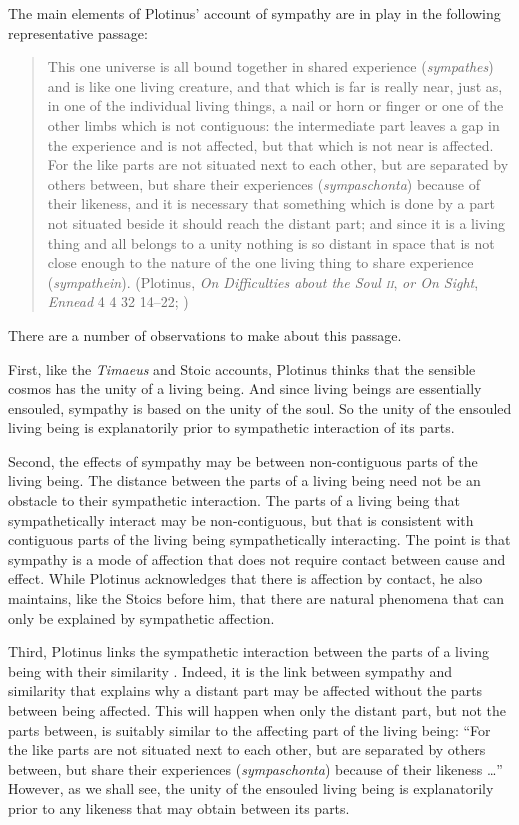 The main elements of Plotinus' account of sympathy are in play in the following representative passage:
\begin{quote}
	This one universe is all bound together in shared experience (\emph{sympathes}) and is like one living creature, and that which is far is really near, just as, in one of the individual living things, a nail or horn or finger or one of the other limbs which is not contiguous: the intermediate part leaves a gap in the experience and is not affected, but that which is not near is affected. For the like parts are not situated next to each other, but are separated by others between, but share their experiences (\emph{sympaschonta}) because of their likeness, and it is necessary that something which is done by a part not situated beside it should reach the distant part; and since it is a living thing and all belongs to a unity nothing is so distant in space that is not close enough to the nature of the one living thing to share experience (\emph{sympathein}). (Plotinus, \emph{On Difficulties about the Soul \textsc{ii}}, \emph{or On Sight}, \emph{Ennead} 4 4 32 14--22; \citealt[235--7]{Armstrong:1984aa})
\end{quote}
There are a number of observations to make about this passage.

First, like the \emph{Timaeus} and Stoic accounts, Plotinus thinks that the sensible cosmos has the unity of a living being. And since living beings are essentially ensouled, sympathy is based on the unity of the soul. So the unity of the ensouled living being is explanatorily prior to sympathetic interaction of its parts.

Second, the effects of sympathy may be between non-contiguous parts of the living being. The distance between the parts of a living being need not be an obstacle to their sympathetic interaction. The parts of a living being that sympathetically interact may be non-contiguous, but that is consistent with contiguous parts of the living being sympathetically interacting. The point is that sympathy is a mode of affection that does not require contact between cause and effect. While Plotinus acknowledges that there is affection by contact, he also maintains, like the Stoics before him, that there are natural phenomena that can only be explained by sympathetic affection.

Third, Plotinus links the sympathetic interaction between the parts of a living being with their similarity \citep{Emilsson:1988uq,Emilsson:2015wf}. Indeed, it is the link between sympathy and similarity that explains why a distant part may be affected without the parts between being affected. This will happen when only the distant part, but not the parts between, is suitably similar to the affecting part of the living being: ``For the like parts are not situated next to each other, but are separated by others between, but share their experiences (\emph{sympaschonta}) because of their likeness \ldots'' However, as we shall see, the unity of the ensouled living being is explanatorily prior to any likeness that may obtain between its parts.

